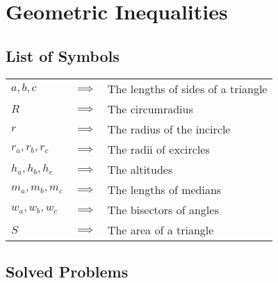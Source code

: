 \documentclass{report}
\begin{document}
\chapter{Geometric Inequalities}
\section{List of Symbols}

\begin{tabular}{lcl}
	$a,b,c$ & $\implies$ & The lengths of sides of a triangle\\
	$R$ & $\implies$ & The circumradius\\
	$r$ & $\implies$ & The radius of the incircle\\
	$r_a,r_b,r_c$ & $\implies$ & The radii of excircles\\
	$h_a,h_b,h_c$ & $\implies$ & The altitudes\\
	$m_a,m_b,m_c$ & $\implies$ & The lengths of medians\\
	$w_a,w_b,w_c$ & $\implies$ & The bisectors of angles\\
	$S$ & $\implies$ & The area of a triangle 
\end{tabular}
\pagebreak
\section{Solved Problems}
\end{document}
